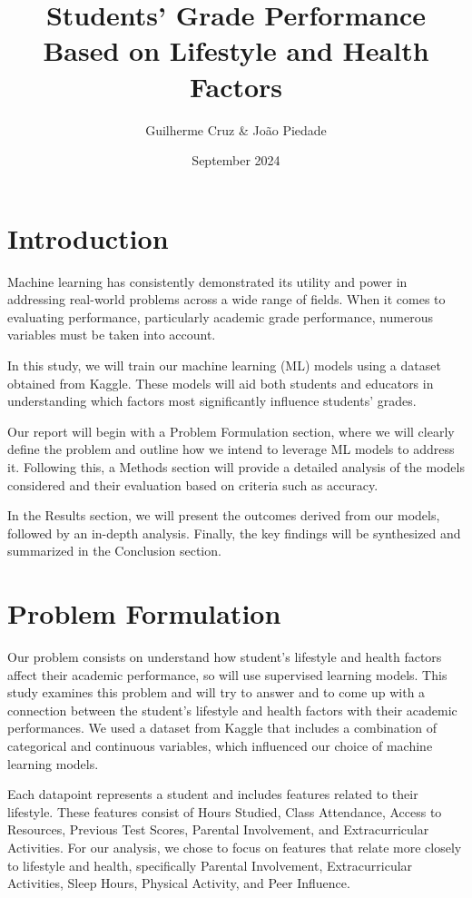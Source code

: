 \documentclass{article}
\title{Students' Grade Performance Based on Lifestyle and Health Factors}
\author{Guilherme Cruz & João Piedade}
\date{September 2024}
\begin{document}
\section{Introduction}
\quad Machine learning has consistently demonstrated its utility and power in addressing real-world problems across a wide range of fields. When it comes to evaluating performance, particularly academic grade performance, numerous variables must be taken into account.

In this study, we will train our machine learning (ML) models using a dataset obtained from Kaggle. These models will aid both students and educators in understanding which factors most significantly influence students' grades.

Our report will begin with a Problem Formulation section, where we will clearly define the problem and outline how we intend to leverage ML models to address it. Following this, a Methods section will provide a detailed analysis of the models considered and their evaluation based on criteria such as accuracy.

In the Results section, we will present the outcomes derived from our models, followed by an in-depth analysis. Finally, the key findings will be synthesized and summarized in the Conclusion section.

\section{Problem Formulation}
\quad Our problem consists on \cite{ibm_what_2023} understand how student's lifestyle and health factors affect their academic performance, so will use supervised learning models.
This study examines this problem and will try to answer \cite{archana_which_nodate}and to come up with a connection between the student's lifestyle and health factors with their academic performances. We used a dataset from Kaggle that includes a combination of categorical and continuous variables, which influenced our choice of machine learning models.


Each datapoint represents a student and includes features related to their lifestyle. These features consist of Hours Studied, Class Attendance, Access to Resources, Previous Test Scores, Parental Involvement, and Extracurricular Activities. For our analysis, we chose to focus on features that relate more closely to lifestyle and health, specifically Parental Involvement, Extracurricular Activities, Sleep Hours, Physical Activity, and Peer Influence.
\end{document}

